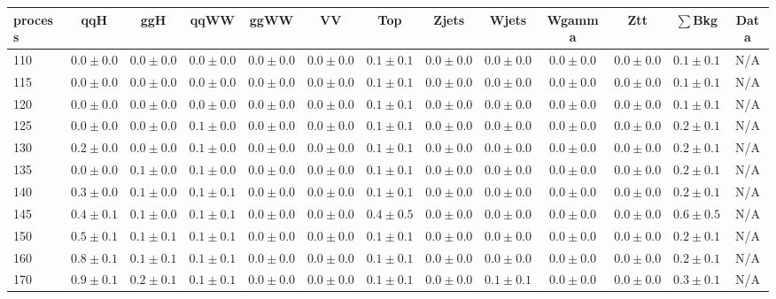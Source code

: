 \begin{table}
{%
 \tiny
 \begin{center}
 \begin{tabular}{l | c c | c c c c c c c c  | c c}
 \hline
 process & qqH & ggH & qqWW & ggWW & VV & Top & Zjets & Wjets & Wgamma & Ztt & $\sum$Bkg & Data \\
 \hline
110 & $0.0\pm0.0$ & $0.0\pm0.0$ & $0.0\pm0.0$ & $0.0\pm0.0$ & $0.0\pm0.0$ & $0.1\pm0.1$ & $0.0\pm0.0$ & $0.0\pm0.0$ & $0.0\pm0.0$ & $0.0\pm0.0$ & $0.1\pm0.1$ & N/A \\
115 & $0.0\pm0.0$ & $0.0\pm0.0$ & $0.0\pm0.0$ & $0.0\pm0.0$ & $0.0\pm0.0$ & $0.1\pm0.1$ & $0.0\pm0.0$ & $0.0\pm0.0$ & $0.0\pm0.0$ & $0.0\pm0.0$ & $0.1\pm0.1$ & N/A \\
120 & $0.0\pm0.0$ & $0.0\pm0.0$ & $0.0\pm0.0$ & $0.0\pm0.0$ & $0.0\pm0.0$ & $0.1\pm0.1$ & $0.0\pm0.0$ & $0.0\pm0.0$ & $0.0\pm0.0$ & $0.0\pm0.0$ & $0.1\pm0.1$ & N/A \\
125 & $0.0\pm0.0$ & $0.0\pm0.0$ & $0.1\pm0.0$ & $0.0\pm0.0$ & $0.0\pm0.0$ & $0.1\pm0.1$ & $0.0\pm0.0$ & $0.0\pm0.0$ & $0.0\pm0.0$ & $0.0\pm0.0$ & $0.2\pm0.1$ & N/A \\
130 & $0.2\pm0.0$ & $0.0\pm0.0$ & $0.1\pm0.0$ & $0.0\pm0.0$ & $0.0\pm0.0$ & $0.1\pm0.1$ & $0.0\pm0.0$ & $0.0\pm0.0$ & $0.0\pm0.0$ & $0.0\pm0.0$ & $0.2\pm0.1$ & N/A \\
135 & $0.0\pm0.0$ & $0.1\pm0.0$ & $0.1\pm0.0$ & $0.0\pm0.0$ & $0.0\pm0.0$ & $0.1\pm0.1$ & $0.0\pm0.0$ & $0.0\pm0.0$ & $0.0\pm0.0$ & $0.0\pm0.0$ & $0.2\pm0.1$ & N/A \\
140 & $0.3\pm0.0$ & $0.1\pm0.0$ & $0.1\pm0.1$ & $0.0\pm0.0$ & $0.0\pm0.0$ & $0.1\pm0.1$ & $0.0\pm0.0$ & $0.0\pm0.0$ & $0.0\pm0.0$ & $0.0\pm0.0$ & $0.2\pm0.1$ & N/A \\
145 & $0.4\pm0.1$ & $0.1\pm0.0$ & $0.1\pm0.1$ & $0.0\pm0.0$ & $0.0\pm0.0$ & $0.4\pm0.5$ & $0.0\pm0.0$ & $0.0\pm0.0$ & $0.0\pm0.0$ & $0.0\pm0.0$ & $0.6\pm0.5$ & N/A \\
150 & $0.5\pm0.1$ & $0.1\pm0.1$ & $0.1\pm0.1$ & $0.0\pm0.0$ & $0.0\pm0.0$ & $0.1\pm0.1$ & $0.0\pm0.0$ & $0.0\pm0.0$ & $0.0\pm0.0$ & $0.0\pm0.0$ & $0.2\pm0.1$ & N/A \\
160 & $0.8\pm0.1$ & $0.1\pm0.1$ & $0.1\pm0.1$ & $0.0\pm0.0$ & $0.0\pm0.0$ & $0.1\pm0.1$ & $0.0\pm0.0$ & $0.0\pm0.0$ & $0.0\pm0.0$ & $0.0\pm0.0$ & $0.2\pm0.1$ & N/A \\
170 & $0.9\pm0.1$ & $0.2\pm0.1$ & $0.1\pm0.1$ & $0.0\pm0.0$ & $0.0\pm0.0$ & $0.1\pm0.1$ & $0.0\pm0.0$ & $0.1\pm0.1$ & $0.0\pm0.0$ & $0.0\pm0.0$ & $0.3\pm0.1$ & N/A \\

\end{tabular}
\end{center}}
\end{table}
